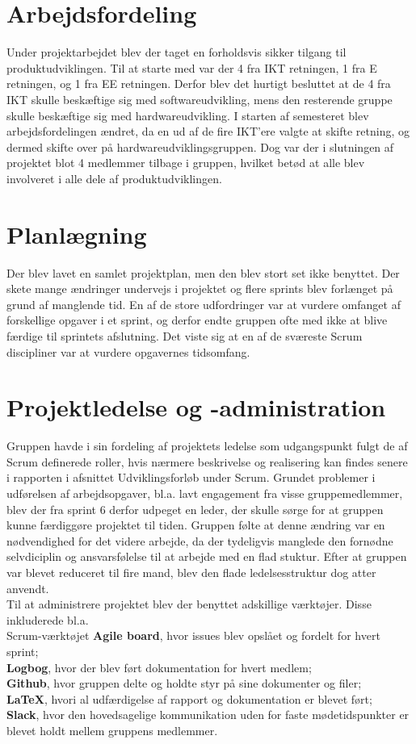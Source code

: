 \section{Arbejdsfordeling}
Under projektarbejdet blev der taget en forholdsvis sikker tilgang til produktudviklingen. Til at starte med var der 4 fra IKT retningen, 1 fra E retningen, 
og 1 fra EE retningen. Derfor blev det hurtigt besluttet at de 4 fra IKT skulle beskæftige sig med softwareudvikling, mens den resterende gruppe skulle
beskæftige sig med hardwareudvikling. I starten af semesteret blev arbejdsfordelingen ændret, da en ud af de fire IKT’ere valgte at skifte retning, og dermed 
skifte over på hardwareudviklingsgruppen. Dog var der i slutningen af projektet blot 4 medlemmer tilbage i gruppen, hvilket betød at alle blev involveret i 
alle dele af produktudviklingen. 


\section{Planlægning}
Der blev lavet en samlet projektplan, men den blev stort set ikke benyttet.
Der skete mange ændringer undervejs i projektet og flere sprints blev forlænget på grund af manglende tid. En af de store udfordringer var at vurdere omfanget 
af forskellige opgaver i et sprint, og derfor endte gruppen ofte med ikke at blive færdige til sprintets afslutning. Det viste sig at en af de sværeste Scrum 
discipliner var at vurdere opgavernes tidsomfang. 

\section{Projektledelse og -administration}
Gruppen havde i sin fordeling af projektets ledelse som udgangspunkt fulgt de af Scrum definerede roller, hvis nærmere beskrivelse og realisering kan findes 
senere i rapporten i afsnittet Udviklingsforløb under Scrum. Grundet problemer i udførelsen af arbejdsopgaver, bl.a. lavt engagement fra visse 
gruppemedlemmer, blev der fra sprint 6 derfor udpeget en leder, der skulle sørge for at gruppen kunne færdiggøre projektet til tiden. Gruppen følte at denne
ændring var en nødvendighed for det videre arbejde, da der tydeligvis manglede den fornødne selvdiciplin
og ansvarsfølelse til at arbejde med en flad stuktur. Efter at gruppen var blevet reduceret til fire mand, blev den flade ledelsesstruktur dog atter anvendt.
\\
Til at administrere projektet blev der benyttet adskillige værktøjer. Disse inkluderede bl.a. \\
Scrum-værktøjet \textbf{Agile board}, hvor issues blev opslået og fordelt for hvert sprint; \\
\textbf{Logbog}, hvor der blev ført dokumentation for hvert medlem; \\
\textbf{Github}, hvor gruppen delte og holdte styr på sine dokumenter og filer; \\
\textbf{LaTeX}, hvori al udfærdigelse af rapport og dokumentation er blevet ført; \\
\textbf{Slack}, hvor den hovedsagelige kommunikation uden for faste mødetidspunkter er blevet holdt mellem gruppens medlemmer.

